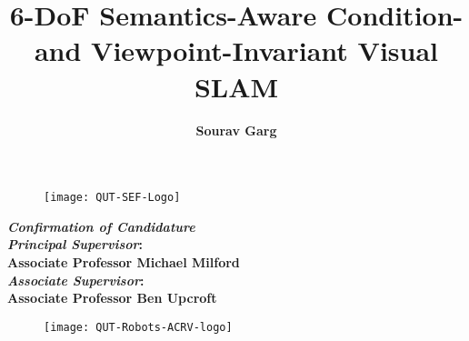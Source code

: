\documentclass{article}
\title{\textbf{\huge 6-DoF Semantics-Aware Condition- and Viewpoint-Invariant Visual SLAM}}
\author{\textbf{\Large Sourav Garg}}
\date{}
\begin{document}
\begin{figure}
\centering
\texttt{[image: QUT-SEF-Logo]}
\end{figure}

\vspace{5cm}

\maketitle

\vspace{1cm}
\begin{center}
\textbf{
\emph{\LARGE Confirmation of Candidature\\}
}
\vspace{2cm}
\textbf{
\Large \emph{Principal Supervisor}: \\ Associate Professor Michael Milford \\
}
\vspace{1cm}
\textbf
{
\Large \emph{Associate Supervisor}: \\ Associate Professor Ben Upcroft \\
} 
\end{center}

\vspace{2cm}

\begin{figure}
\centering
\texttt{[image: QUT-Robots-ACRV-logo]}
\end{figure}

\pagebreak
\end{document}
